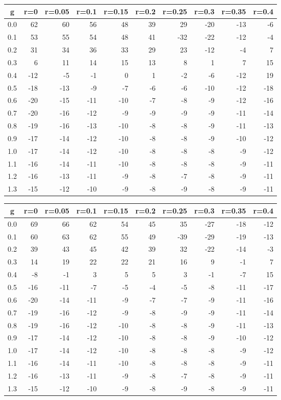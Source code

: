 %
\begin{table}[!tbp]
 \begin{center}
 \begin{tabular}{rrrrrrrrrr}\hline\hline
\multicolumn{1}{c}{g}&\multicolumn{1}{c}{r=0}&\multicolumn{1}{c}{r=0.05}&\multicolumn{1}{c}{r=0.1}&\multicolumn{1}{c}{r=0.15}&\multicolumn{1}{c}{r=0.2}&\multicolumn{1}{c}{r=0.25}&\multicolumn{1}{c}{r=0.3}&\multicolumn{1}{c}{r=0.35}&\multicolumn{1}{c}{r=0.4}\tabularnewline
\hline
0.0& 62& 60& 56& 48&39& 29&-20&-13& -6\tabularnewline
0.1& 53& 55& 54& 48&41&-32&-22&-12& -4\tabularnewline
0.2& 31& 34& 36& 33&29& 23&-12& -4&  7\tabularnewline
0.3&  6& 11& 14& 15&13&  8&  1&  7& 15\tabularnewline
0.4&-12& -5& -1&  0& 1& -2& -6&-12& 19\tabularnewline
0.5&-18&-13& -9& -7&-6& -6&-10&-12&-18\tabularnewline
0.6&-20&-15&-11&-10&-7& -8& -9&-12&-16\tabularnewline
0.7&-20&-16&-12& -9&-9& -9& -9&-11&-14\tabularnewline
0.8&-19&-16&-13&-10&-8& -8& -9&-11&-13\tabularnewline
0.9&-17&-14&-12&-10&-8& -8& -9&-10&-12\tabularnewline
1.0&-17&-14&-12&-10&-8& -8& -8& -9&-12\tabularnewline
1.1&-16&-14&-11&-10&-8& -8& -8& -9&-11\tabularnewline
1.2&-16&-13&-11& -9&-8& -7& -8& -9&-11\tabularnewline
1.3&-15&-12&-10& -9&-8& -9& -8& -9&-11\tabularnewline
\hline
\end{tabular}

\end{center}

\end{table}

%
\begin{table}[!tbp]
 \begin{center}
 \begin{tabular}{rrrrrrrrrr}\hline\hline
\multicolumn{1}{c}{g}&\multicolumn{1}{c}{r=0}&\multicolumn{1}{c}{r=0.05}&\multicolumn{1}{c}{r=0.1}&\multicolumn{1}{c}{r=0.15}&\multicolumn{1}{c}{r=0.2}&\multicolumn{1}{c}{r=0.25}&\multicolumn{1}{c}{r=0.3}&\multicolumn{1}{c}{r=0.35}&\multicolumn{1}{c}{r=0.4}\tabularnewline
\hline
0.0& 69& 66& 62& 54&45& 35&-27&-18&-12\tabularnewline
0.1& 60& 63& 62& 55&49&-39&-29&-19&-13\tabularnewline
0.2& 39& 43& 45& 42&39& 32&-22&-14& -3\tabularnewline
0.3& 14& 19& 22& 22&21& 16&  9& -1&  7\tabularnewline
0.4& -8& -1&  3&  5& 5&  3& -1& -7& 15\tabularnewline
0.5&-16&-11& -7& -5&-4& -5& -8&-11&-17\tabularnewline
0.6&-20&-14&-11& -9&-7& -7& -9&-11&-16\tabularnewline
0.7&-19&-16&-12& -9&-8& -9& -9&-11&-14\tabularnewline
0.8&-19&-16&-12&-10&-8& -8& -9&-11&-13\tabularnewline
0.9&-17&-14&-12&-10&-8& -8& -9&-10&-12\tabularnewline
1.0&-17&-14&-12&-10&-8& -8& -8& -9&-12\tabularnewline
1.1&-16&-14&-11&-10&-8& -8& -8& -9&-11\tabularnewline
1.2&-16&-13&-11& -9&-8& -7& -8& -9&-11\tabularnewline
1.3&-15&-12&-10& -9&-8& -9& -8& -9&-11\tabularnewline
\hline
\end{tabular}

\end{center}

\end{table}

